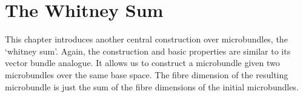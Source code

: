 \chapter{The Whitney Sum}\label{chapter::whitney}
\begin{myparagraph}
    This chapter introduces another central construction over microbundles, the `whitney sum'.
    Again, the construction and basic properties are similar to its vector bundle analogue.
    It allows us to construct a microbundle given two microbundles over the same base space.
    The fibre dimension of the resulting microbundle
    is just the sum of the fibre dimensions of the initial microbundles.
\end{myparagraph}


